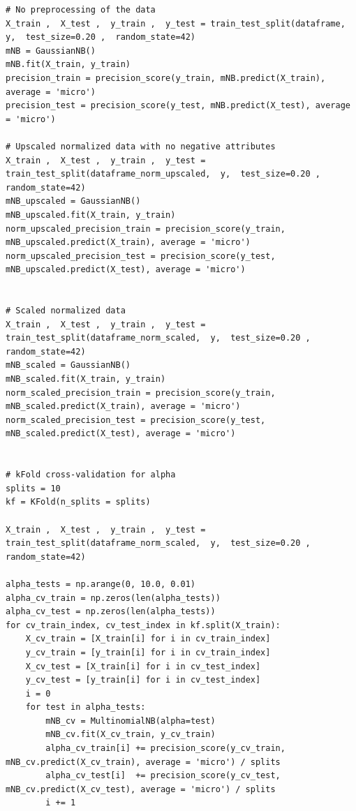 \documentclass[11pt,a4paper]{article}
\begin{document}
\begin{lstlisting}
# No preprocessing of the data
X_train ,  X_test ,  y_train ,  y_test = train_test_split(dataframe,  y,  test_size=0.20 ,  random_state=42)
mNB = GaussianNB()
mNB.fit(X_train, y_train)
precision_train = precision_score(y_train, mNB.predict(X_train), average = 'micro')
precision_test = precision_score(y_test, mNB.predict(X_test), average = 'micro')

# Upscaled normalized data with no negative attributes
X_train ,  X_test ,  y_train ,  y_test = train_test_split(dataframe_norm_upscaled,  y,  test_size=0.20 ,  random_state=42)
mNB_upscaled = GaussianNB()
mNB_upscaled.fit(X_train, y_train)
norm_upscaled_precision_train = precision_score(y_train, mNB_upscaled.predict(X_train), average = 'micro')
norm_upscaled_precision_test = precision_score(y_test, mNB_upscaled.predict(X_test), average = 'micro')


# Scaled normalized data 
X_train ,  X_test ,  y_train ,  y_test = train_test_split(dataframe_norm_scaled,  y,  test_size=0.20 ,  random_state=42)
mNB_scaled = GaussianNB()
mNB_scaled.fit(X_train, y_train)
norm_scaled_precision_train = precision_score(y_train, mNB_scaled.predict(X_train), average = 'micro')
norm_scaled_precision_test = precision_score(y_test, mNB_scaled.predict(X_test), average = 'micro')


# kFold cross-validation for alpha
splits = 10
kf = KFold(n_splits = splits)

X_train ,  X_test ,  y_train ,  y_test = train_test_split(dataframe_norm_scaled,  y,  test_size=0.20 ,  random_state=42)

alpha_tests = np.arange(0, 10.0, 0.01)
alpha_cv_train = np.zeros(len(alpha_tests))
alpha_cv_test = np.zeros(len(alpha_tests))
for cv_train_index, cv_test_index in kf.split(X_train):
    X_cv_train = [X_train[i] for i in cv_train_index]
    y_cv_train = [y_train[i] for i in cv_train_index]
    X_cv_test = [X_train[i] for i in cv_test_index]
    y_cv_test = [y_train[i] for i in cv_test_index]
    i = 0
    for test in alpha_tests:
        mNB_cv = MultinomialNB(alpha=test)
        mNB_cv.fit(X_cv_train, y_cv_train)
        alpha_cv_train[i] += precision_score(y_cv_train, mNB_cv.predict(X_cv_train), average = 'micro') / splits
        alpha_cv_test[i]  += precision_score(y_cv_test, mNB_cv.predict(X_cv_test), average = 'micro') / splits
        i += 1

\end{lstlisting}
\end{document}
